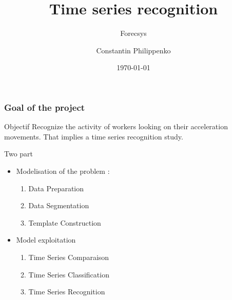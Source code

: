 \documentclass[11pt, sans, handout]{beamer}
\title[Présentation]{Time series recognition}
\subtitle[\ldots]{Forecsys}
\author[Dupont]{Constantin Philippenko}
\institute[MIPT]{Moscou}
\date{\today}
\begin{document}
\begin{frame}
\titlepage
\end{frame}

\begin{frame}
	\frametitle{Goal of the project}
	
	\begin{alertblock}{Objectif}
	Recognize the activity of workers looking on their acceleration movements. That implies a time series recognition study.
	\end{alertblock}
	
	\begin{block}{Two part}
	\begin{itemize}
		\item Modelisation of the problem :
			\begin{enumerate}
				\item Data Preparation
				\item Data Segmentation
				\item Template Construction
			\end{enumerate}
		\item Model exploitation	
			\begin{enumerate}
				\item Time Series Comparaison
				\item Time Series Classification
				\item Time Series Recognition
			\end{enumerate}			 
	\end{itemize}
	
	\end{block}
	
\end{frame}
\end{document}
